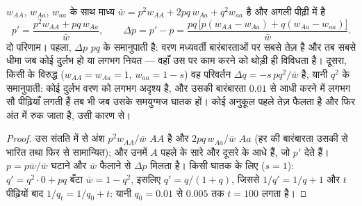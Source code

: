 \begin{theorem}\label{thm:b2:population-genetics:selection}
  $w_{AA}$, $w_{Aa}$, $w_{aa}$ के साथ माध्य
 $\bar w = p^{2}w_{AA} + 2pq\,w_{Aa} + q^{2}w_{aa}$ है और अगली पीढ़ी में
 है
\[
p' = \frac{p^{2}w_{AA} + pq\,w_{Aa}}{\bar w}, \qquad
\Delta p = p' - p = \frac{pq\,\bigl[p(w_{AA} - w_{Aa}) + q(w_{Aa} - w_{aa})\bigr]}{\bar w}.
\]
दो परिणाम। पहला, $\Delta p$ $pq$ के समानुपाती है: वरण
मध्यवर्ती बारंबारताओं पर सबसे तेज़ है और तब सबसे धीमा जब कोई 
दुर्लभ हो या लगभग नियत --- वहाँ उस पर काम करने को थोड़ी ही विविधता है।
दूसरा, किसी   के विरुद्ध ($w_{AA} = w_{Aa} = 1$, $w_{aa} =
1 - s$) वह परिवर्तन $\Delta q = -s\,pq^{2}/\bar w$ है, यानी
$q^{2}$ के समानुपाती: कोई दुर्लभ  वरण को लगभग अदृश्य है, और
उसकी बारंबारता $0.01$ से आधी करने में लगभग सौ पीढ़ियाँ लगती हैं
तब भी जब उसके समयुग्मज घातक हों। कोई अनुकूल  
पहले तेज़ फैलता है और फिर अंत में रुक जाता है, उसी
कारण से।
\end{theorem}
\begin{proof}
उस संतति में से अंश $p^{2}w_{AA}/\bar w$ $AA$ है और
$2pq\,w_{Aa}/\bar w$ $Aa$ (हर  की बारंबारता उसकी
 से भारित तथा फिर से सामान्यित); और उनमें $A$  पहले के सारे
और दूसरे के आधे हैं, जो $p'$ देते हैं। $p =
p\bar w/\bar w$ घटाने और $\bar w$ फैलाने से $\Delta p$ मिलता है। किसी घातक
 के लिए ($s = 1$): $q' = q^{2}\cdot 0 + pq$ बँटा $\bar w = 1 -
q^{2}$, इसलिए $q' = q/(1 + q)$, जिससे $1/q' = 1/q + 1$ और $t$
पीढ़ियों बाद $1/q_t = 1/q_0 + t$: यानी $q_0 = 0.01$ से $0.005$ तक
$t = 100$ लगता है।
\end{proof}

